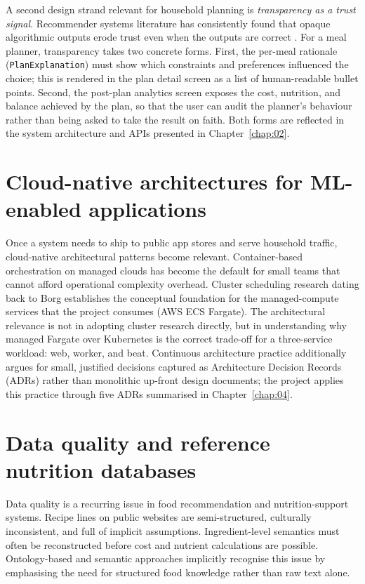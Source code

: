 A second design strand relevant for household planning is \emph{transparency as a trust signal}. Recommender systems literature has consistently found that opaque algorithmic outputs erode trust even when the outputs are correct \cite{adomavicius2005}. For a meal planner, transparency takes two concrete forms. First, the per-meal rationale (\texttt{PlanExplanation}) must show which constraints and preferences influenced the choice; this is rendered in the plan detail screen as a list of human-readable bullet points. Second, the post-plan analytics screen exposes the cost, nutrition, and balance achieved by the plan, so that the user can audit the planner's behaviour rather than being asked to take the result on faith. Both forms are reflected in the system architecture and APIs presented in Chapter~\ref{chap:02}.

\section{Cloud-native architectures for ML-enabled applications}

Once a system needs to ship to public app stores and serve household traffic, cloud-native architectural patterns become relevant. Container-based orchestration on managed clouds has become the default for small teams that cannot afford operational complexity overhead. Cluster scheduling research dating back to Borg \cite{burns2016} establishes the conceptual foundation for the managed-compute services that the project consumes (AWS ECS Fargate). The architectural relevance is not in adopting cluster research directly, but in understanding why managed Fargate over Kubernetes is the correct trade-off for a three-service workload: web, worker, and beat. Continuous architecture practice \cite{erder2015} additionally argues for small, justified decisions captured as Architecture Decision Records (ADRs) rather than monolithic up-front design documents; the project applies this practice through five ADRs summarised in Chapter~\ref{chap:04}.

\section{Data quality and reference nutrition databases}

Data quality is a recurring issue in food recommendation and nutrition-support systems. Recipe lines on public websites are semi-structured, culturally inconsistent, and full of implicit assumptions. Ingredient-level semantics must often be reconstructed before cost and nutrient calculations are possible. Ontology-based and semantic approaches \cite{bianchini2015,al_nazer2014,maneerat2013} implicitly recognise this issue by emphasising the need for structured food knowledge rather than raw text alone.

